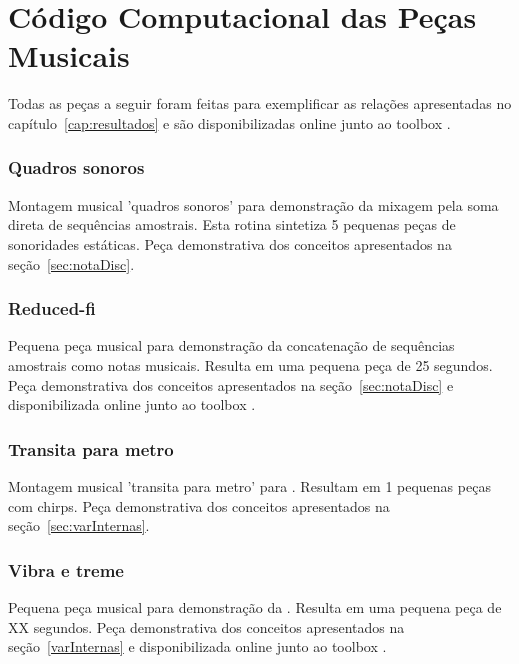 \chapter{Código Computacional das Peças Musicais}
\label{cap:codigoPecas}
Todas as peças a seguir foram feitas para exemplificar as relações apresentadas no capítulo~\ref{cap:resultados} e são disponibilizadas online junto ao toolbox \massa.\cite{MASSA}


\subsection{Quadros sonoros}\label{ap:quadros}
Montagem musical 'quadros sonoros' para demonstração da mixagem pela soma direta de sequências amostrais. Esta rotina sintetiza 5 pequenas peças de sonoridades estáticas. Peça demonstrativa dos conceitos apresentados na seção~\ref{sec:notaDisc}.

\subsection{Reduced-fi}\label{ap:reduced}
Pequena peça musical para demonstração da concatenação de sequências amostrais como notas musicais. Resulta em uma pequena peça de 25 segundos. Peça demonstrativa dos conceitos apresentados na seção~\ref{sec:notaDisc} e disponibilizada online junto ao toolbox \massa.\cite{MASSA}



\subsection{Transita para metro}\label{ap:transita}
Montagem musical 'transita para metro' para . Resultam em 1 pequenas peças com chirps. Peça demonstrativa dos conceitos apresentados na seção~\ref{sec:varInternas}.

\subsection{Vibra e treme}\label{ap:vibra}
Pequena peça musical para demonstração da . Resulta em uma pequena peça de XX segundos. Peça demonstrativa dos conceitos apresentados na seção~\ref{varInternas} e disponibilizada online junto ao toolbox \massa.





